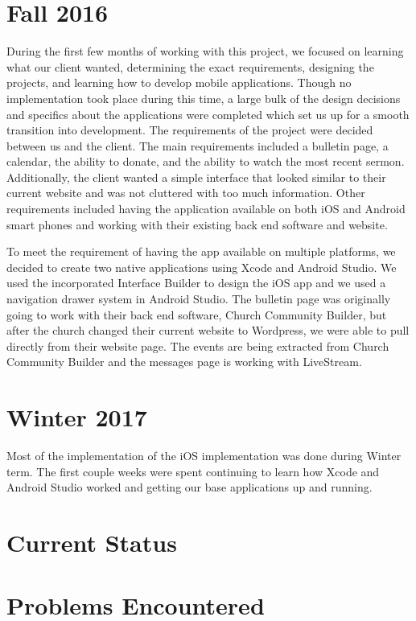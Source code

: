\documentclass[letterpaper,10pt,draftclsnofoot,onecolumn,titlepage]{IEEEtran}
\begin{document}
\section{Fall 2016}
		During the first few months of working with this project, we focused on learning what our client wanted, determining the exact requirements, designing the projects, and learning how to develop mobile applications.
		 Though no implementation took place during this time, a large bulk of the design decisions and specifics about the applications were completed which set us up for a smooth transition into development. 
		The requirements of the project were decided between us and the client. 
		The main requirements included a bulletin page, a calendar, the ability to donate, and the ability to watch the most recent sermon. 
		Additionally, the client wanted a simple interface that looked similar to their current website and was not cluttered with too much information. 
		Other requirements included having the application available on both iOS and Android smart phones and working with their existing back end software and website. 
		
		To meet the requirement of having the app available on multiple platforms, we decided to create two native applications using Xcode and Android Studio. 
		We used the incorporated Interface Builder to design the iOS app and we used a navigation drawer system in Android Studio. 
		The bulletin page was originally going to work with their back end software, Church Community Builder, but after the church changed their current website to Wordpress, we were able to pull directly from their website page. 
		The events are being extracted from Church Community Builder and the messages page is working with LiveStream. 
	
		
\section{Winter 2017}
		Most of the implementation of the iOS implementation was done during Winter term. 
		The first couple weeks were spent continuing to learn how Xcode and Android Studio worked and getting our base applications up and running. 
		
		
\section{Current Status}

\section{Problems Encountered}
\end{document}
